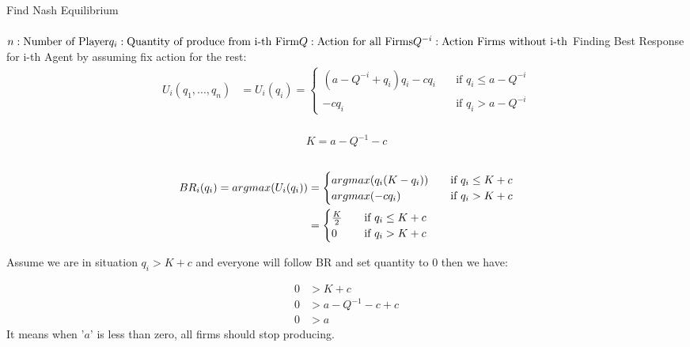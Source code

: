 \documentclass[
  course = {{IE579 Game Theory and Multi-Agent Reinforcement Learning}},
  assignment = 1,
  name = {{Mohammad Mahdi Rahimi}},
  studentnumber = {{20208244}},
  email = {{mahi@kaist.ac.kr}},
  firstexercise = 1
]{aga-homework}
\begin{document}
\exercise
\subexercise Find Nash Equilibrium
\\\\
$
n: \text{Number of Player}\\\\
q_i: \text{Quantity of produce from i-th Firm}\\\\
Q: \text{Action for all Firms} \\\\
Q^{-i}: \text{Action Firms without i-th} \\\\
$
Finding Best Response for i-th Agent by assuming fix action for the rest:\\
\begin{equation} \label{eq1}
\begin{split}
U_i(q_1, ..., q_n) & = U_i(q_i) = \begin{cases}
    (a-Q^{-i}+q_i)q_i - cq_i &\quad\text{if } q_i \le a - Q^{-i} \\
    -cq_i &\quad\text{if } q_i > a - Q^{-i}
\end{cases}
\end{split}
\end{equation}\\
\begin{equation} \label{eq1}
\begin{split}
K = a - Q^{-1} - c
\end{split}
\end{equation}\\
\begin{equation} \label{eq1}
\begin{split}
BR_i(q_i) = argmax(U_i(q_i)) & = \begin{cases}
    argmax(q_i(K - q_i)) &\quad\text{if } q_i \le K + c\\
    argmax(-cq_i) &\quad\text{if } q_i > K + c
\end{cases}\\
& = \begin{cases}
    K \over 2 &\quad\text{if } q_i \le K + c\\
    0 &\quad\text{if } q_i > K + c
\end{cases}
\end{split}
\end{equation}

Assume we are in situation $q_i > K + c$ and everyone will follow BR and set quantity to 0 then we have:

\begin{equation} \label{eq1}
\begin{split}
0 & > K + c \\
0 & > a - Q^{-1} - c + c\\
0 & > a
\end{split}
\end{equation}
It means when '$a$' is less than zero, all firms should stop producing.
\end{document}
